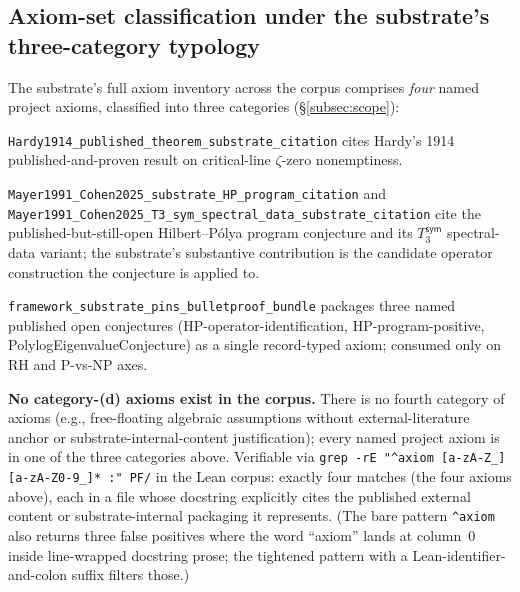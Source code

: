 \documentclass[11pt,a4paper]{amsart}
\theoremstyle{plain}
\theoremstyle{definition}
\begin{document}
\subsection{Axiom-set classification under the substrate's three-category typology}\label{subsec:repro-axiom-categories}

The substrate's full axiom inventory across the corpus comprises \emph{four} named project axioms, classified into three categories (\S\ref{subsec:scope}):

\begin{description}[font=\normalfont\bfseries,leftmargin=2em,itemsep=2pt]
\item[(a) external-anchor citation of external proven theorem.] \texttt{Hardy1914\_published\_theorem\_substrate\_citation} cites Hardy's 1914 published-and-proven result on critical-line $\zeta$-zero nonemptiness.
\item[(b) Named-open-conjecture citation.] \texttt{Mayer1991\_Cohen2025\_substrate\_HP\_program\_citation} and \texttt{Mayer1991\_Cohen2025\_T3\_sym\_spectral\_data\_substrate\_citation} cite the published-but-still-open Hilbert--P\'olya program conjecture and its $T_3^{\textsf{sym}}$ spectral-data variant; the substrate's substantive contribution is the candidate operator construction the conjecture is applied to.
\item[(c) Substrate-internal-content packaging.] \texttt{framework\_substrate\_pins\_bulletproof\_bundle} packages three named published open conjectures (HP-operator-identification, HP-program-positive, PolylogEigenvalueConjecture) as a single record-typed axiom; consumed only on RH and P-vs-NP axes.
\end{description}

\textbf{No category-(d) axioms exist in the corpus.} There is no fourth category of axioms (e.g., free-floating algebraic assumptions without external-literature anchor or substrate-internal-content justification); every named project axiom is in one of the three categories above. Verifiable via \texttt{grep -rE "\textasciicircum axiom [a-zA-Z\_][a-zA-Z0-9\_]* :" PF/} in the Lean corpus: exactly four matches (the four axioms above), each in a file whose docstring explicitly cites the published external content or substrate-internal packaging it represents. (The bare pattern \texttt{\textasciicircum axiom\ } also returns three false positives where the word ``axiom'' lands at column~0 inside line-wrapped docstring prose; the tightened pattern with a Lean-identifier-and-colon suffix filters those.)
\end{document}
